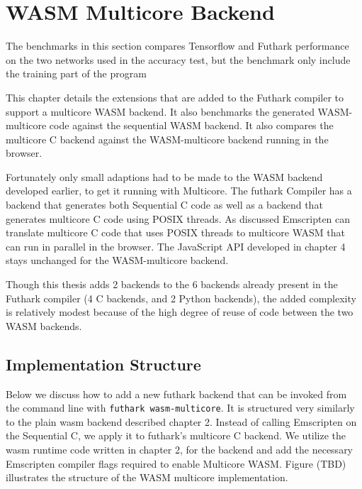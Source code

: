 \documentclass[11pt]{book}
\begin{document}
\newpage

\chapter{WASM Multicore Backend}
The benchmarks in this section compares Tensorflow and Futhark performance on the
two networks used in the accuracy test, but the benchmark only include the training part of the program

This chapter details the extensions that are added to the Futhark compiler to support a multicore WASM backend. It also benchmarks the generated WASM-multicore code against the sequential WASM backend. It also compares the multicore C backend against the WASM-multicore backend running in the browser.

Fortunately only small adaptions had to be made to the WASM backend developed earlier, to get it running with Multicore. The futhark Compiler has a backend that generates both Sequential C code as well as a backend that generates multicore C code using POSIX threads. As discussed Emscripten can translate multicore C code that uses POSIX threads to multicore WASM that can run in parallel in the browser. The JavaScript API developed in chapter 4 stays unchanged for the WASM-multicore backend. 

Though this thesis adds 2 backends to the 6 backends already present in the Futhark compiler (4 C backends, and 2 Python backends), the added complexity is relatively modest because of the high degree of reuse of code between the two WASM backends. 


\section{Implementation Structure}

Below we discuss how to add a new futhark backend that can be invoked from the command line with \texttt{futhark wasm-multicore}. It is structured very similarly to the plain wasm backend described chapter 2. Instead of calling Emscripten on the Sequential C, we apply it to futhark's multicore C backend. We utilize the wasm runtime code written in chapter 2, for the backend and add the necessary Emscripten compiler flags required to enable Multicore WASM. Figure (TBD) illustrates the structure of the WASM multicore implementation.
\end{document}
